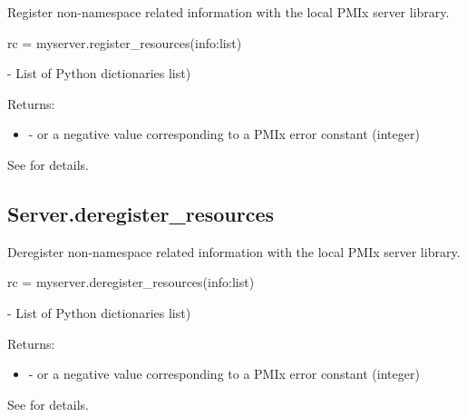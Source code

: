 \summary
Register non-namespace related information with the local \ac{PMIx} server library.

\format

\pyspecificstart
\begin{codepar}
rc = myserver.register_resources(info:list)
\end{codepar}
\pyspecificend


\begin{arglist}
 - List of Python  dictionaries list)
\end{arglist}

Returns:

\begin{itemize}
    \item {} -  or a negative value corresponding to a PMIx error constant (integer)
\end{itemize}

See  for details.


\subsection{Server.deregister_resources}

\summary
Deregister non-namespace related information with the local \ac{PMIx} server library.

\format

\pyspecificstart
\begin{codepar}
rc = myserver.deregister_resources(info:list)
\end{codepar}
\pyspecificend


\begin{arglist}
 - List of Python  dictionaries list)
\end{arglist}

Returns:

\begin{itemize}
    \item {} -  or a negative value corresponding to a PMIx error constant (integer)
\end{itemize}

See  for details.


